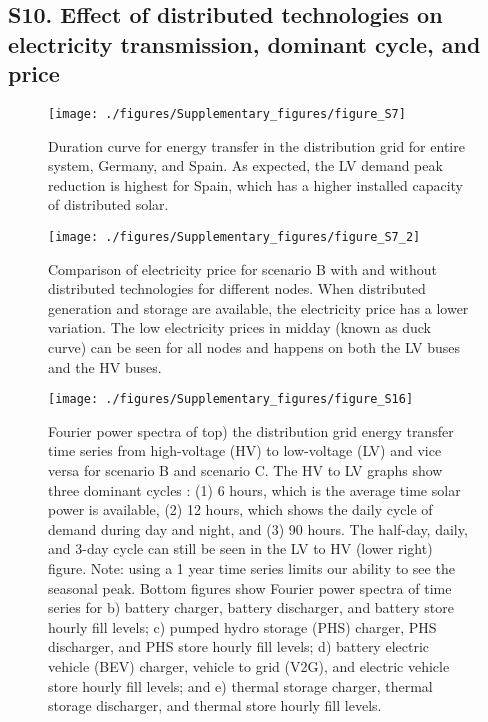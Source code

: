 \subsection*{S10. Effect of distributed technologies on electricity transmission, dominant cycle, and price }

\begin{figure}[H]
\renewcommand*{\thefigure}{S\arabic{figure}}

\texttt{[image: ./figures/Supplementary\_figures/figure\_S7]}
\caption{Duration curve for energy transfer in the distribution grid for entire system, Germany, and Spain. As expected, the LV demand peak reduction is highest for Spain, which has a higher installed capacity of distributed solar. }
\end{figure}

\begin{figure}[H]
\renewcommand*{\thefigure}{S\arabic{figure}}

\texttt{[image: ./figures/Supplementary\_figures/figure\_S7\_2]}
\caption{Comparison of electricity price for scenario B with and without distributed technologies for different nodes. When distributed generation and storage are available, the electricity price has a lower variation. The low electricity prices in midday (known as duck curve) can be seen for all nodes and happens on both the LV buses and the HV buses.  }
\end{figure}

\begin{figure}[H]
\renewcommand*{\thefigure}{S\arabic{figure}}

\texttt{[image: ./figures/Supplementary\_figures/figure\_S16]}
\caption{Fourier power spectra of top) the distribution grid energy transfer time series from high-voltage (HV) to low-voltage (LV) and vice versa for scenario B and scenario C. The HV to LV graphs show three dominant cycles : (1) 6 hours, which is the average time solar power is available, (2) 12 hours, which shows the daily cycle of demand during day and night, and (3) 90 hours. The half-day, daily, and 3-day cycle can still be seen in the LV to HV (lower right) figure. Note: using a 1 year time series limits our ability to see the seasonal peak. Bottom figures show Fourier power spectra of time series for b) battery charger, battery discharger, and battery store hourly fill levels; c) pumped hydro storage (PHS) charger, PHS discharger, and PHS store hourly fill levels; d) battery electric vehicle (BEV) charger, vehicle to grid (V2G), and electric vehicle store hourly fill levels; and e) thermal storage charger, thermal storage discharger, and thermal store hourly fill levels.  
}
\end{figure}




